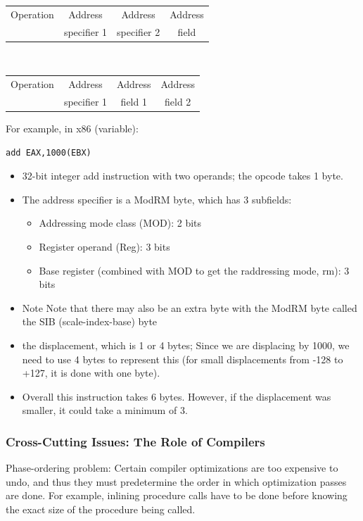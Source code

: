 \begin{tabular}{|c|c|c|c|}
\hline
Operation & Address & Address & Address \\ 
& specifier 1 & specifier 2 & field \\
\hline
\end{tabular} \\
\begin{tabular}{|c|c|c|c|}
\hline
Operation & Address & Address & Address \\ 
& specifier 1 & field 1 & field 2\\
\hline
\end{tabular}
For example, in x86 (variable):
\begin{verbatim}
add EAX,1000(EBX)
\end{verbatim}
\begin{itemize}
  \item 32-bit integer add instruction with two operands; the opcode takes 1 byte.
  \item The address specifier is a ModRM byte, which has 3 subfields:
  \begin{itemize}
    \item Addressing mode class (MOD): 2 bits 
    \item Register operand (Reg): 3 bits 
    \item Base register (combined with MOD to get the raddressing mode, rm): 3 bits
  \end{itemize}
  \item Note Note that there may also be an extra byte with the ModRM byte called the SIB (scale-index-base) byte
  \item the displacement, which is 1 or 4 bytes; Since we are displacing by 1000, we need to use 4 bytes to represent this (for small displacements from -128 to +127, it is done with one byte).
  \item Overall this instruction takes 6 bytes. However, if the displacement was smaller, it could take a minimum of 3.
\end{itemize}
\subsubsection{Cross-Cutting Issues: The Role of Compilers}
Phase-ordering problem: Certain compiler optimizations are too expensive to undo, and thus they must predetermine the order in which optimization passes are done. For example, inlining procedure calls have to be done before knowing the exact size of the procedure being called.
